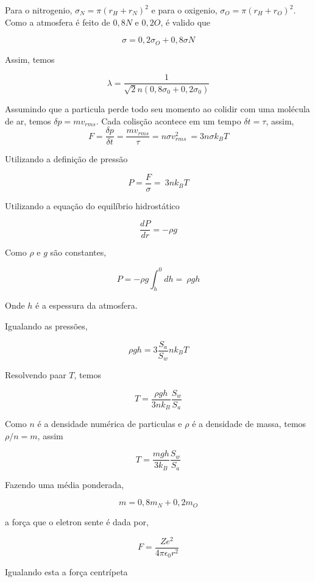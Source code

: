 \documentclass[11pt]{article}
\begin{document}
\begin{pproblem}
\begin{pssolution*}{}{}
\begin{alternativas}
    Para o nitrogenio, \(\sigma_N = \pi(r_H + r_N)^2\) e para o oxigenio, \(\sigma_O = \pi (r_H + r_O)^2\). Como a atmosfera é feito de \(0,8 N\) e \(0,2 O\), é valido que 

    \[\sigma = 0,2\sigma_O + 0,8\sigma N\]

    Assim, temos 

    \[\boxed{\lambda = \frac{1}{\sqrt{2}n(0,8\sigma_0 + 0,2\sigma_0)}}\]

    \item Assumindo que a particula perde todo seu momento ao colidir com uma molécula de ar, temos \(\delta p = mv_{rms}\). Cada colisção acontece em um tempo \(\delta t =\tau\), assim, 
    \[F = \frac{\delta p }{\delta t} = \frac{mv_{rms}}{\tau} = n\sigma v_{rms}^2 \  \boxed{ = 3n\sigma k_BT}\]

    \item Utilizando a definição de pressão 
    
    \[P = \frac{F}{\sigma} = \ \boxed{3nk_B T} \]

    \item Utilizando a equação do equilíbrio hidrostático 
    
    \[\frac{dP}{dr} = -\rho g\]

    Como \(\rho\) e \(g\) são constantes, 

    \[P = -\rho g \int_h^0dh= \ \boxed{\rho g h}\]

    Onde \(h\) é a espessura da atmosfera.

    \item Igualando as pressões, 

    \[\rho g h = 3\frac{S_a}{S_w}nk_BT\]

    Resolvendo paar \(T\), temos 

    \[T = \frac{\rho g h}{3nk_B}\frac{S_w}{S_a}\]

    Como \(n\) é a densidade numérica de particulas e \(\rho\) é a densidade de massa, temos \(\rho/n = m\), assim

    \[\boxed{T= \frac{m g h}{3k_B}\frac{S_w}{S_a}}\]

    \item Fazendo uma média ponderada, 
    
    \[\boxed{m = 0,8 m_N + 0,2 m_O}\]

    \item a força que o eletron sente é dada por, 
    
    \[F = \frac{Ze^2}{4\pi \epsilon_0r^2}\]

    Igualando esta a força centrípeta


\end{alternativas}
\end{pssolution*}
\end{pproblem}
\end{document}
